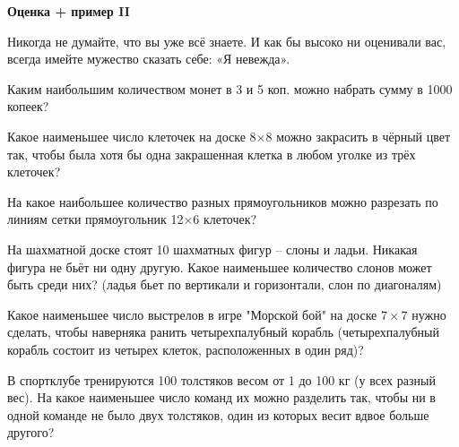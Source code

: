 \centerline{\bf \Huge Оценка + пример II}

\begin{flushright}
        \scriptsize{Никогда не думайте, что вы уже всё знаете. И как бы высоко ни оценивали вас, всегда имейте мужество сказать себе: «Я невежда».}
\end{flushright}

Каким наибольшим количеством монет в 3 и 5 коп. можно набрать сумму в 1000 копеек?

Какое наименьшее число клеточек на доске 8×8 можно закрасить в чёрный цвет так, чтобы была хотя бы одна закрашенная клетка в любом уголке из трёх клеточек?

На какое наибольшее количество разных прямоугольников можно разрезать по линиям сетки прямоугольник 12×6 клеточек?


На шахматной доске стоят 10 шахматных фигур – слоны и ладьи. Никакая фигура не бьёт ни одну другую. Какое наименьшее количество слонов может быть среди них? (ладья бьет по вертикали и горизонтали, слон по диагоналям)

Какое наименьшее число выстрелов в игре "Морской бой" на доске $7\times7$ нужно сделать, чтобы наверняка ранить четырехпалубный корабль (четырехпалубный корабль состоит из четырех клеток, расположенных в один ряд)?


В спортклубе тренируются 100 толстяков весом от 1 до 100 кг (у всех разный вес). На какое наименьшее число команд их можно разделить так, чтобы ни в одной команде не было двух толстяков, один из которых весит вдвое больше другого?

